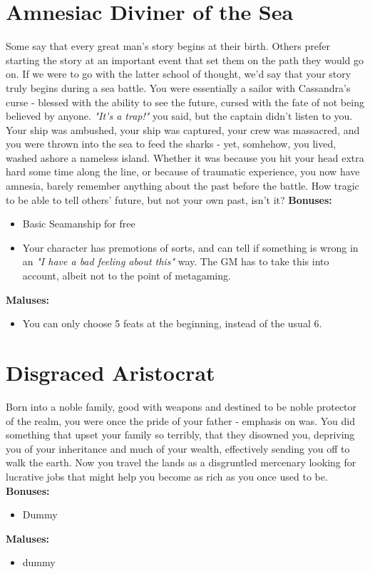\documentclass[openany,10pt,a4paper]{book}
\begin{document}
\begin{itemize}
\begin{itemize}
\begin{itemize}
\begin{itemize}
\section{Amnesiac Diviner of the Sea}
Some say that every great man's story begins at their birth. Others prefer starting the story at an important event that set them on the path they would go on. If we were to go with the latter school of thought, we'd say that your story truly begins during a sea battle. You were essentially a sailor with Cassandra's curse - blessed with the ability to see the future, cursed with the fate of not being believed by anyone. \textit{"It's a trap!"} you said, but the captain didn't listen to you. Your ship was ambushed, your ship was captured, your crew was massacred, and you were thrown into the sea to feed the sharks - yet, somhehow, you lived, washed ashore a nameless island. Whether it was because you hit your head extra hard some time along the line, or because of traumatic experience, you now have amnesia, barely remember anything about the past before the battle. How tragic to be able to tell others' future, but not your own past, isn't it?\newline
\textbf{Bonuses:}
\begin{itemize}
	\item Basic Seamanship for free
	\item Your character has premotions of sorts, and can tell if something is wrong in an \textit{"I have a bad feeling about this"} way. The GM has to take this into account, albeit not to the point of metagaming.
\end{itemize}
\textbf{Maluses:}
\begin{itemize}
	\item You can only choose 5 feats at the beginning, instead of the usual 6.
\end{itemize}
\section{Disgraced Aristocrat}
Born into a noble family, good with weapons and destined to be noble protector of the realm, you were once the pride of your father - emphasis on was. You did something that upset your family so terribly, that they disowned you, depriving you of your inheritance and much of your wealth, effectively sending you off to walk the earth. Now you travel the lands as a disgruntled mercenary looking for lucrative jobs that might help you become as rich as you once used to be.\newline
\textbf{Bonuses:}
\begin{itemize}
	\item Dummy
\end{itemize}
\textbf{Maluses:}
\begin{itemize}
	\item dummy
\end{itemize}

\end{itemize}
\end{itemize}
\end{itemize}
\end{itemize}
\end{document}
